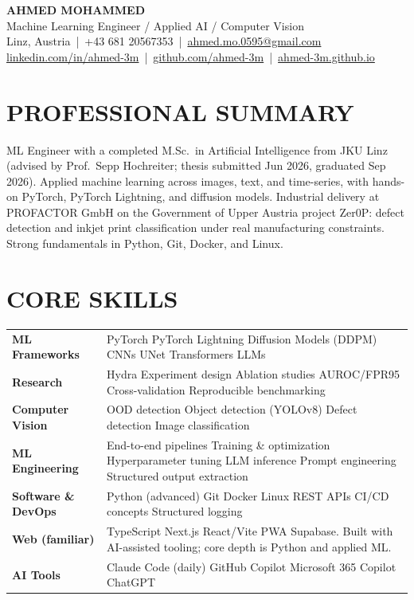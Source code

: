 \documentclass[11pt,a4paper]{article}
\newcommand{\skillrow}[2]{%
  \textbf{#1} & #2 \\[1pt]%
}
\begin{document}
\begin{center}
  {\LARGE\bfseries\color{accent} AHMED MOHAMMED}\\[2pt]
  {\small Machine Learning Engineer / Applied AI / Computer Vision}\\[3pt]
  {\footnotesize Linz, Austria \,|\, +43 681 20567353 \,|\, \href{mailto:ahmed.mo.0595@gmail.com}{ahmed.mo.0595@gmail.com}}\\[1pt]
  {\footnotesize \href{https://linkedin.com/in/ahmed-3m}{linkedin.com/in/ahmed-3m} \,|\, \href{https://github.com/ahmed-3m}{github.com/ahmed-3m} \,|\, \href{https://ahmed-3m.github.io}{ahmed-3m.github.io}}
\end{center}
\vspace{2pt}

\section*{PROFESSIONAL SUMMARY}
ML Engineer with a completed M.Sc.\ in Artificial Intelligence from JKU Linz (advised by Prof.\ Sepp Hochreiter; thesis submitted Jun 2026, graduated Sep 2026). Applied machine learning across images, text, and time-series, with hands-on PyTorch, PyTorch Lightning, and diffusion models. Industrial delivery at PROFACTOR GmbH on the Government of Upper Austria project Zer0P: defect detection and inkjet print classification under real manufacturing constraints. Strong fundamentals in Python, Git, Docker, and Linux.

\section*{CORE SKILLS}
\renewcommand{\arraystretch}{1.02}
\noindent\begin{tabularx}{\textwidth}{@{}>{\raggedright\arraybackslash}p{3.9cm}X@{}}
\skillrow{ML Frameworks}{PyTorch \textbullet{} PyTorch Lightning \textbullet{} Diffusion Models (DDPM) \textbullet{} CNNs \textbullet{} UNet \textbullet{} Transformers \textbullet{} LLMs}
\skillrow{Research}{Hydra \textbullet{} Experiment design \textbullet{} Ablation studies \textbullet{} AUROC/FPR95 \textbullet{} Cross-validation \textbullet{} Reproducible benchmarking}
\skillrow{Computer Vision}{OOD detection \textbullet{} Object detection (YOLOv8) \textbullet{} Defect detection \textbullet{} Image classification}
\skillrow{ML Engineering}{End-to-end pipelines \textbullet{} Training \& optimization \textbullet{} Hyperparameter tuning \textbullet{} LLM inference \textbullet{} Prompt engineering \textbullet{} Structured output extraction}
\skillrow{Software \& DevOps}{Python (advanced) \textbullet{} Git \textbullet{} Docker \textbullet{} Linux \textbullet{} REST APIs \textbullet{} CI/CD concepts \textbullet{} Structured logging}
\skillrow{Web (familiar)}{TypeScript \textbullet{} Next.js \textbullet{} React/Vite PWA \textbullet{} Supabase. Built with AI-assisted tooling; core depth is Python and applied ML.}
\skillrow{AI Tools}{Claude Code (daily) \textbullet{} GitHub Copilot \textbullet{} Microsoft 365 Copilot \textbullet{} ChatGPT}
\end{tabularx}
\end{document}
